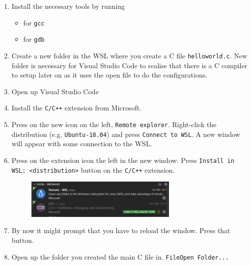 
\begin{enumerate}
    \item Install the necessary tools by running
    \begin{itemize}
        \item {} for \texttt{gcc}
        \item {} for \texttt{gdb}
    \end{itemize}

    \item Create a new folder in the WSL where you create a C file \texttt{helloworld.c}. New folder is necessary for Visual Studio Code to realise that there is a C compiler to setup later on as it uses the open file to do the configurations.
    
    \item Open up Visual Studio Code
    
    \item Install the \texttt{C/C++} extension from Microsoft.
    
    \item Press on the new icon on the left, \texttt{Remote explorer}. Right-click the distribution (e.g. \texttt{Ubuntu-18.04}) and press \texttt{Connect to WSL}. A new window will appear with some connection to the WSL.
    
    \item Press on the extension icon the left in the new window. Press \texttt{Install in WSL: <distribution>} button on the \texttt{C/C++} extension.
    
    \begin{figure}[H]
        \centering
        \includegraphics[width=0.7\textwidth]{figures/vscode_extensions.PNG}
    \end{figure}
    
    \item By now it might prompt that you have to reload the window. Press that button.

    \item Open up the folder you created the main C file in. \texttt{File\ra Open Folder...}
    

\end{enumerate}
